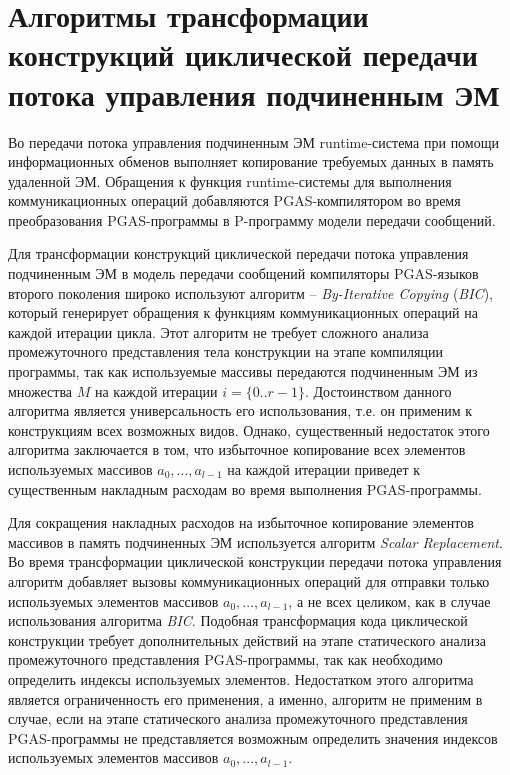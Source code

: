 \section{Алгоритмы трансформации конструкций циклической передачи потока управления подчиненным ЭМ}

Во передачи потока управления подчиненным ЭМ runtime-система при помощи информационных обменов выполняет копирование требуемых данных в память удаленной ЭМ. Обращения к функция runtime-системы для выполнения коммуникационных операций добавляются PGAS-компилятором во время преобразования PGAS-программы в P-программу модели передачи сообщений.

Для трансформации конструкций циклической передачи потока управления подчиненным ЭМ в модель передачи сообщений компиляторы PGAS-языков второго поколения широко используют алгоритм -- \textit{By-Iterative Copying} (\textit{BIC}), который генерирует обращения к функциям коммуникационных операций на каждой итерации цикла. Этот алгоритм не требует сложного анализа промежуточного представления тела конструкции на этапе компиляции программы, так как используемые массивы передаются подчиненным ЭМ из множества $M$ на каждой итерации $i=\{0..r-1\}$. Достоинством данного алгоритма является универсальность его использования, т.е. он применим к конструкциям всех возможных видов. Однако, существенный недостаток этого алгоритма заключается в том, что избыточное копирование всех элементов используемых массивов $a_{0},...,a_{l-1}$ на каждой итерации приведет к существенным накладным расходам во время выполнения PGAS-программы.

Для сокращения накладных расходов на избыточное копирование элементов массивов в память подчиненных ЭМ используется алгоритм \textit{Scalar Replacement}. Во время трансформации циклической конструкции передачи потока управления алгоритм  добавляет вызовы коммуникационных операций для отправки только используемых элементов массивов $a_{0},...,a_{l-1}$, а не всех целиком, как в случае использования алгоритма \textit{BIC}. Подобная трансформация кода циклической конструкции требует дополнительных действий на этапе статического анализа промежуточного представления PGAS-программы, так как необходимо определить индексы используемых элементов. Недостатком этого алгоритма является ограниченность его применения, а именно, алгоритм не применим в случае, если на этапе статического анализа промежуточного представления PGAS-программы не представляется возможным определить значения индексов используемых
элементов массивов $a_{0},...,a_{l-1}$.

